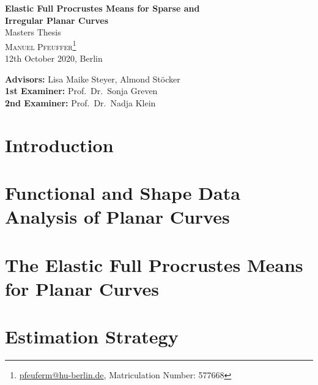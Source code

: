 \documentclass[a4paper,12pt,pagesize,DIV=calc,smallheadings,english]{article}
\theoremstyle{plain}
\begin{document}
\begin{titlepage}

  \vspace*{0.5cm}

  \begin{center}
    {\LARGE\textbf{Elastic Full Procrustes Means for Sparse and\vspace{0.4cm}\\
    Irregular Planar Curves}}
  \vspace{1cm}\\
    {\large Masters Thesis}
  \vspace{0.7cm}\\
  \textsc{Manuel Pfeuffer\footnote{\url{pfeuferm@hu-berlin.de}, Matriculation Number: 577668}}
  \vspace{0.1cm}\\
  12th October 2020, Berlin
  \vspace{1cm}\\

  \vfill
  \end{center}

  \noindent \textbf{Advisors:} Lisa Maike Steyer, Almond Stöcker\\
  \noindent \textbf{1st Examiner:} Prof.\ Dr.\ Sonja Greven\\
  \noindent \textbf{2nd Examiner:} Prof.\ Dr.\ Nadja Klein
  \vspace{0.5em}

\end{titlepage}


\tableofcontents
\newpage


\section{Introduction}
\label{sec:intro}


\section{Functional and Shape Data Analysis of Planar Curves}
\label{sec:theo}


\section{The Elastic Full Procrustes Means for Planar Curves}
\label{sec:mean}


\section{Estimation Strategy}
\label{sec:algo}
\end{document}
